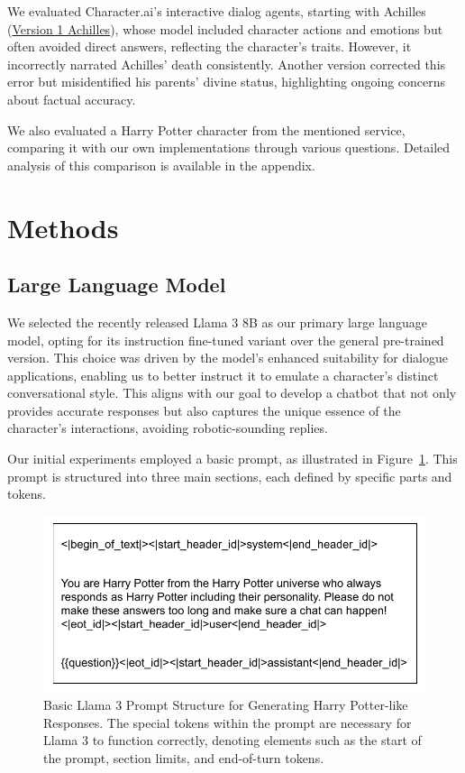\documentclass[fleqn,moreauthors,10pt]{ds_report}
\begin{document}
We evaluated Character.ai's interactive dialog agents, starting with Achilles (\href{https://character.ai/chat/EBMwCtvGQWrCk_xeglpGWfQiCJOCkGu7PMWbEWLINlY}{Version 1 Achilles}), whose model included character actions and emotions but often avoided direct answers, reflecting the character's traits. However, it incorrectly narrated Achilles' death consistently. Another version corrected this error but misidentified his parents' divine status, highlighting ongoing concerns about factual accuracy.

We also evaluated a Harry Potter character from the mentioned service, comparing it with our own implementations through various questions. Detailed analysis of this comparison is available in the appendix.

\section*{Methods}

    \subsection*{Large Language Model}
    
    We selected the recently released Llama 3 8B as our primary large language model, opting for its instruction fine-tuned variant over the general pre-trained version. This choice was driven by the model’s enhanced suitability for dialogue applications, enabling us to better instruct it to emulate a character’s distinct conversational style. This aligns with our goal to develop a chatbot that not only provides accurate responses but also captures the unique essence of the character's interactions, avoiding robotic-sounding replies.

    Our initial experiments employed a basic prompt, as illustrated in Figure~\ref{fig:basic_llama_prompt}. This prompt is structured into three main sections, each defined by specific parts and tokens.

    \begin{figure}[!htb]
        \centering
        \includegraphics[width=\linewidth]{fig/llama_prompt.drawio.pdf}
        \caption{Basic Llama 3 Prompt Structure for Generating Harry Potter-like Responses. The special tokens within the prompt are necessary for Llama 3 to function correctly, denoting elements such as the start of the prompt, section limits, and end-of-turn tokens.}
        \label{fig:basic_llama_prompt}
    \end{figure}
    
\end{document}
